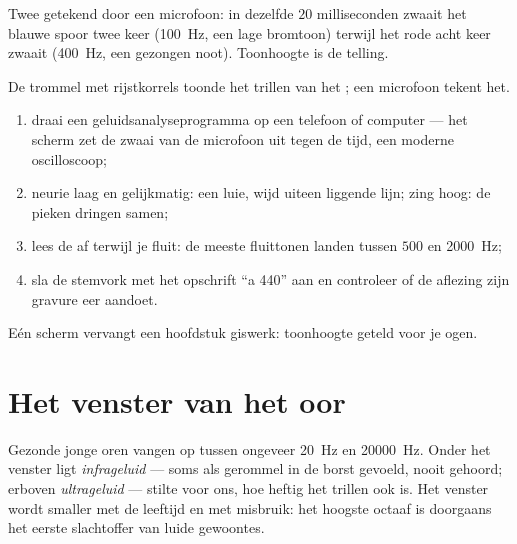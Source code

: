 \begin{omfigure}

{\small Twee  getekend door een microfoon: in dezelfde $20$
milliseconden zwaait het blauwe spoor twee keer (\qty{100}{Hz}, een lage
bromtoon) terwijl het rode acht keer zwaait (\qty{400}{Hz}, een gezongen
noot). Toonhoogte is de telling.}
\end{omfigure}

\begin{method}\label{met:g8:sound-pitch-loudness:seeing}
De trommel met rijstkorrels toonde het trillen van het
; een microfoon tekent het.
\begin{enumerate}
  \item draai een geluidsanalyseprogramma op een telefoon of computer
        --- het scherm zet de zwaai van de microfoon uit tegen de
        tijd, een moderne oscilloscoop;
  \item neurie laag en gelijkmatig: een luie, wijd uiteen liggende
        lijn; zing hoog: de pieken dringen samen;
  \item lees de  af terwijl je fluit: de meeste
        fluittonen landen tussen $500$ en \qty{2000}{Hz};
  \item sla de stemvork met het opschrift ``a 440'' aan en controleer
        of de aflezing zijn gravure eer aandoet.
\end{enumerate}
Eén scherm vervangt een hoofdstuk giswerk: toonhoogte geteld voor je
ogen.
\end{method}

\section{Het venster van het oor}

\begin{proposition}\label{prop:g8:sound-pitch-loudness:range}
Gezonde jonge oren vangen  op tussen ongeveer
\qty{20}{Hz} en \qty{20000}{Hz}. Onder het venster ligt
\emph{infrageluid} --- soms als gerommel in de borst
gevoeld, nooit gehoord; erboven \emph{ultrageluid}
--- stilte voor ons, hoe heftig het trillen ook is. Het venster wordt
smaller met de leeftijd en met misbruik: het hoogste octaaf is
doorgaans het eerste slachtoffer van luide gewoontes.
\end{proposition}

